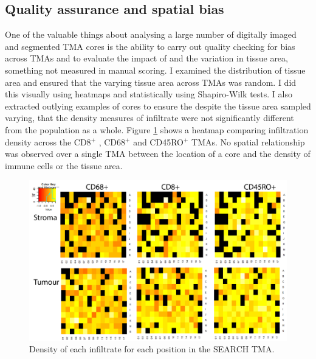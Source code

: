  \subsection{Quality assurance and spatial bias}
 
One of the valuable things about analysing a large number of digitally imaged and segmented TMA cores is the ability to carry out quality checking for bias across TMAs and to evaluate the impact of and the variation in tissue area, something not measured in manual scoring. I examined the distribution of tissue area and ensured that the varying tissue area across TMAs was random. I did this visually using heatmaps and statistically using Shapiro-Wilk tests. I also extracted outlying examples of cores to ensure the despite the tissue area sampled varying, that the density measures of infiltrate were not significantly different from the population as a whole. Figure \ref{fig:heatmap} shows a heatmap comparing infiltration density across the CD8$^+$ , CD68$^+$ and CD45RO$^+$ TMAs. No spatial relationship was observed over a single TMA between the location of a core and the density of immune cells or the tissue area. 

\begin{figure}
    \centering
    \includegraphics{Chapter2/Figs/Raster/Thesis-heatmap.png}
    \caption{Density of each infiltrate for each position in the SEARCH TMA.}
    \label{fig:heatmap}
\end{figure}


